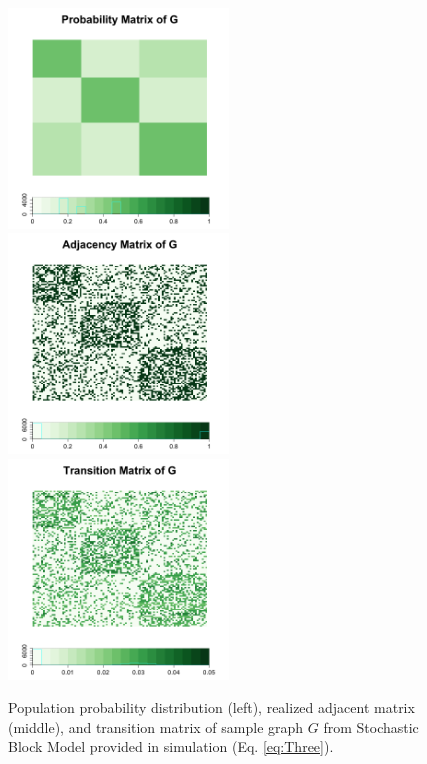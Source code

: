 \documentclass[12pt]{article}
\theoremstyle{definition}
\begin{document}
\begin{figure}[H]
	\centering
	\label{fig:matrics}
	\includegraphics[width=2.3in]{../Figure/pmat.png}
	\includegraphics[width=2.3in]{../Figure/Amat.png}
	\includegraphics[width=2.3in]{../Figure/Tmat.png}
	\caption{Population probability distribution (left), realized adjacent matrix (middle), and transition matrix of sample graph $G$ from Stochastic Block Model provided in simulation (Eq. \ref{eq:Three}).}
\end{figure}	
\end{document}
